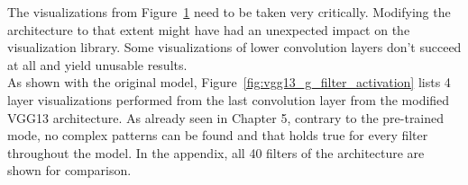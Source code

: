 \begin{figure}[!h]
{}
\label{fig:asbestos_gradcam_g}
\end{figure}

The visualizations from Figure~\ref{fig:asbestos_gradcam_g} need to be taken very critically. Modifying the architecture to that extent might have had an unexpected impact on the visualization library. Some visualizations of lower convolution layers don't succeed at all and yield unusable results.\\

As shown with the original model, Figure~\ref{fig:vgg13_g_filter_activation} lists 4 layer visualizations performed from the last convolution layer from the modified VGG13 architecture. As already seen in Chapter 5, contrary to the pre-trained mode, no complex patterns can be found and that holds true for every filter throughout the model. In the appendix, all 40 filters of the architecture are shown for comparison.

